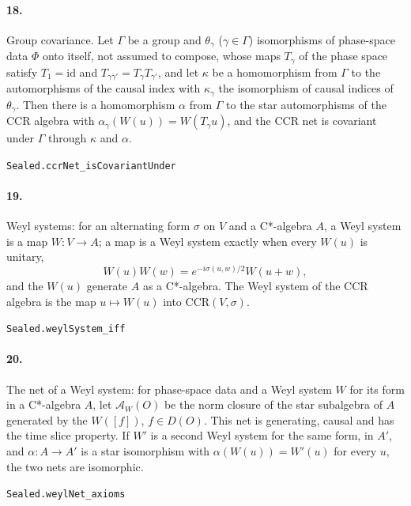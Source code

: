 \documentclass[11pt]{article}
\begin{document}
\paragraph{18.} Group covariance. Let $\Gamma$ be a group and $\theta_\gamma$ ($\gamma \in \Gamma$) isomorphisms of phase-space data $\Phi$ onto itself, not assumed to compose, whose maps $T_\gamma$ of the phase space satisfy $T_1 = \mathrm{id}$ and $T_{\gamma\gamma'} = T_\gamma T_{\gamma'}$, and let $\kappa$ be a homomorphism from $\Gamma$ to the automorphisms of the causal index with $\kappa_\gamma$ the isomorphism of causal indices of $\theta_\gamma$. Then there is a homomorphism $\alpha$ from $\Gamma$ to the star automorphisms of the CCR algebra with $\alpha_\gamma(W(u)) = W(T_\gamma u)$, and the CCR net is covariant under $\Gamma$ through $\kappa$ and $\alpha$.\par{\footnotesize\texttt{Sealed.ccrNet\_isCovariantUnder}}

\paragraph{19.} Weyl systems: for an alternating form $\sigma$ on $V$ and a C*-algebra $A$, a Weyl system is a map $W : V \to A$; a map is a Weyl system exactly when every $W(u)$ is unitary, \[W(u) W(w) = e^{-i\sigma(u, w)/2} W(u + w),\] and the $W(u)$ generate $A$ as a C*-algebra. The Weyl system of the CCR algebra is the map $u \mapsto W(u)$ into $\mathrm{CCR}(V, \sigma)$.\par{\footnotesize\texttt{Sealed.weylSystem\_iff}}

\paragraph{20.} The net of a Weyl system: for phase-space data and a Weyl system $W$ for its form in a C*-algebra $A$, let $\mathcal A_W(O)$ be the norm closure of the star subalgebra of $A$ generated by the $W([f])$, $f \in D(O)$. This net is generating, causal and has the time slice property. If $W'$ is a second Weyl system for the same form, in $A'$, and $\alpha : A \to A'$ is a star isomorphism with $\alpha(W(u)) = W'(u)$ for every $u$, the two nets are isomorphic.\par{\footnotesize\texttt{Sealed.weylNet\_axioms}}
\end{document}
